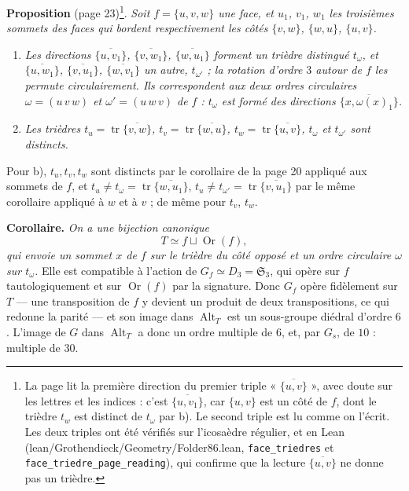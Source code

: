 \documentclass[11pt,a4paper]{article}
\begin{document}
\textbf{Proposition} (page 23)\footnote{La page lit la première direction du premier triple
« $\overline{\{u, v\}}$ », avec doute sur les lettres et les indices : c'est
$\overline{\{u, v_1\}}$, car $\{u, v\}$ est un côté de $f$, dont le trièdre
$t_w$ est distinct de $t_\omega$ par b). Le second triple est lu comme on
l'écrit. Les deux triples ont été vérifiés sur l'icosaèdre régulier, et en
Lean (lean/Grothendieck/Geometry/Folder86.lean, \texttt{face\_triedres} et
\texttt{face\_triedre\_page\_reading}), qui confirme que la lecture
$\overline{\{u, v\}}$ ne donne pas un trièdre.}. \emph{Soit $f = \{u, v, w\}$ une face, et
$u_1$, $v_1$, $w_1$ les troisièmes sommets des faces qui bordent
respectivement les côtés $\{v, w\}$, $\{w, u\}$, $\{u, v\}$.}
\begin{enumerate}
  \item[a)] \emph{Les directions $\overline{\{u, v_1\}}$, $\overline{\{v,
    w_1\}}$, $\overline{\{w, u_1\}}$ forment un trièdre distingué
    $t_\omega$, et $\overline{\{u, w_1\}}$, $\overline{\{v, u_1\}}$,
    $\overline{\{w, v_1\}}$ un autre, $t_{\omega'}$ ; la rotation d'ordre $3$
    autour de $f$ les permute circulairement. Ils correspondent aux deux
    ordres circulaires $\omega = (u\,v\,w)$ et $\omega' = (u\,w\,v)$ de $f$ :
    $t_\omega$ est formé des directions $\overline{\{x, \omega(x)_1\}}$.}
  \item[b)] \emph{Les trièdres $t_u = \operatorname{tr}\overline{\{v, w\}}$,
    $t_v = \operatorname{tr}\overline{\{w, u\}}$, $t_w =
    \operatorname{tr}\overline{\{u, v\}}$, $t_\omega$ et $t_{\omega'}$ sont
    distincts.}
\end{enumerate}
Pour b), $t_u, t_v, t_w$ sont distincts par le corollaire de la page 20
appliqué aux sommets de $f$, et $t_u \neq t_\omega = \operatorname{tr}
\overline{\{w, u_1\}}$, $t_u \neq t_{\omega'} = \operatorname{tr}\overline{\{v,
u_1\}}$ par le même corollaire appliqué à $w$ et à $v$ ; de même pour $t_v$,
$t_w$.

\textbf{Corollaire.} \emph{On a une bijection canonique}
\[
T \simeq f \sqcup \operatorname{Or}(f),
\]
\emph{qui envoie un sommet $x$ de $f$ sur le trièdre du côté opposé et un ordre
circulaire $\omega$ sur $t_\omega$.} Elle est compatible à l'action de $G_f
\simeq D_3 = \mathfrak{S}_3$, qui opère sur $f$ tautologiquement et sur
$\operatorname{Or}(f)$ par la signature. Donc $G_f$ opère fidèlement sur $T$ ---
une transposition de $f$ y devient un produit de deux transpositions, ce qui
redonne la parité --- et son image dans $\operatorname{Alt}_T$ est un
sous-groupe diédral d'ordre $6$. L'image de $G$ dans $\operatorname{Alt}_T$ a
donc un ordre multiple de $6$, et, par $G_s$, de $10$ : multiple de $30$.
\end{document}
